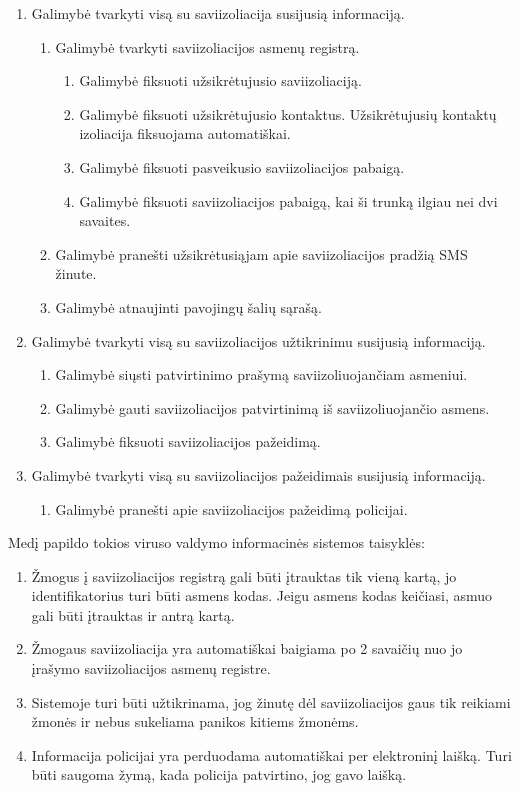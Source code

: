 \documentclass{VUMIFPSkursinis}
\begin{document}
\begin{enumerate}
\item Galimybė tvarkyti visą su saviizoliacija susijusią informaciją.
	\begin{enumerate}
		\item Galimybė tvarkyti saviizoliacijos asmenų registrą.
		\begin{enumerate}
			\item Galimybė fiksuoti užsikrėtujusio saviizoliaciją.
			\item Galimybė fiksuoti užsikrėtujusio kontaktus. Užsikrėtujusių kontaktų izoliacija fiksuojama automatiškai.
			\item Galimybė fiksuoti pasveikusio saviizoliacijos pabaigą.
			\item Galimybė fiksuoti saviizoliacijos pabaigą, kai ši trunką ilgiau nei dvi savaites.
		\end{enumerate}
		\item Galimybė pranešti užsikrėtusiąjam apie saviizoliacijos pradžią SMS žinute.
		\item Galimybė atnaujinti pavojingų šalių sąrašą.
	\end{enumerate}
	\item Galimybė tvarkyti visą su saviizoliacijos užtikrinimu susijusią informaciją.
	\begin{enumerate}
		\item Galimybė siųsti patvirtinimo prašymą saviizoliuojančiam asmeniui.
		\item Galimybė gauti saviizoliacijos patvirtinimą iš saviizoliuojančio asmens.
		\item Galimybė fiksuoti saviizoliacijos pažeidimą.
	\end{enumerate}
	\item Galimybė tvarkyti visą su saviizoliacijos pažeidimais susijusią informaciją.
	\begin{enumerate}
		\item Galimybė pranešti apie saviizoliacijos pažeidimą policijai.
	\end{enumerate}
\end{enumerate}

Medį papildo tokios viruso valdymo informacinės sistemos taisyklės:
\begin{enumerate}
	\item Žmogus į saviizoliacijos registrą gali būti įtrauktas tik vieną kartą, jo identifikatorius turi būti asmens kodas. Jeigu asmens kodas keičiasi, asmuo gali būti įtrauktas ir antrą kartą.
	\item Žmogaus saviizoliacija yra automatiškai baigiama po 2 savaičių nuo jo įrašymo saviizoliacijos asmenų registre.
	\item Sistemoje turi būti užtikrinama, jog žinutę dėl saviizoliacijos gaus tik reikiami žmonės ir nebus sukeliama panikos kitiems žmonėms.
	\item Informacija policijai yra perduodama automatiškai per elektroninį laišką. Turi būti saugoma žymą, kada policija patvirtino, jog gavo laišką.
\end{enumerate}
\end{document}
